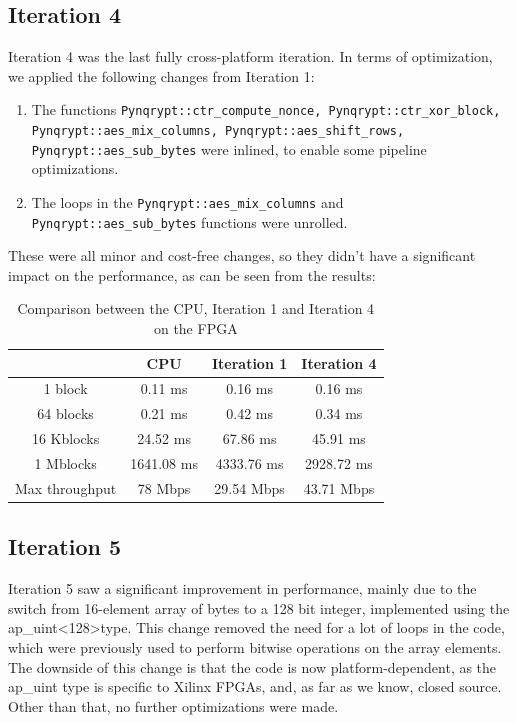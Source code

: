 \documentclass[12pt,oneside,a4paper]{article}
\begin{document}
\subsection{Iteration 4} \label{subsec:iter4}
Iteration 4 was the last fully cross-platform iteration.
In terms of optimization, we applied the following changes from Iteration 1:
\begin{enumerate}
	\item The functions {\tt Pynqrypt::ctr\_compute\_nonce, Pynqrypt::ctr\_xor\_block, Pynqrypt::aes\_mix\_columns, Pynqrypt::aes\_shift\_rows, Pynqrypt::aes\_sub\_bytes} were inlined, to enable some pipeline optimizations.
	\item The loops in the {\tt Pynqrypt::aes\_mix\_columns} and {\tt Pynqrypt::aes\_sub\_bytes} functions were unrolled.
\end{enumerate}

These were all minor and cost-free changes, so they didn't have a significant impact on the performance, as can be seen from the results:
\begin{table}[h!]
	\centering
	\begin{tabular}{cccc}
		\toprule
		 & CPU & Iteration 1 & Iteration 4 \\
		\midrule
		1 block & 0.11 ms & 0.16 ms & 0.16 ms \\
		64 blocks & 0.21 ms & 0.42 ms & 0.34 ms \\
		16 Kblocks & 24.52 ms & 67.86 ms & 45.91 ms \\
		1 Mblocks & 1641.08 ms & 4333.76 ms & 2928.72 ms \\
		Max throughput & 78 Mbps & 29.54 Mbps & 43.71 Mbps \\
		\bottomrule
	\end{tabular}
	\caption{Comparison between the CPU, Iteration 1 and Iteration 4 on the FPGA}
\end{table}

\subsection{Iteration 5} \label{subsec:iter5}
Iteration 5 saw a significant improvement in performance, mainly due to the switch from 16-element array of bytes to a 128 bit integer, implemented using the ap\_uint\textless128\textgreater type.
This change removed the need for a lot of loops in the code, which were previously used to perform bitwise operations on the array elements.
The downside of this change is that the code is now platform-dependent, as the ap\_uint type is specific to Xilinx FPGAs, and, as far as we know, closed source. Other than that, no further optimizations were made.
\end{document}
